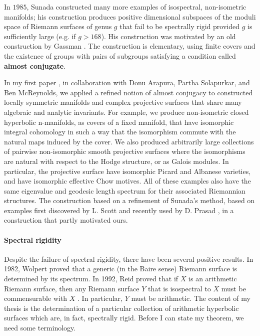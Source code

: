 \documentclass[12pt]{article}
\begin{document}
In $1985$, Sunada \cite{sunada1985}  constructed many more examples of isospectral, non-isometric manifolds; his construction produces positive dimensional subspaces of the moduli space of Riemann surfaces of genus $g$ that fail to be spectrally rigid provided $g$ is sufficiently large (e.g. if $g > 168$). His construction was motivated by an old construction by Gassman \cite{gassmann1926}. The
construction is elementary, using finite covers and the existence of groups with pairs of subgroups satisfying a condition called {\bf almost conjugate}. 

In my first paper \cite{arapura2019} , in collaboration with Donu Arapura, Partha Solapurkar, and Ben McReynolds, we applied a refined notion of almost conjugacy to  constructed locally symmetric manifolds and complex projective surfaces that share many algebraic and analytic invariants. For example, we produce non-isometric closed hyperbolic n-manifolds, as covers of a fixed manifold, that have isomorphic integral cohomology in such a way that the isomorphism commute with the natural maps induced by the cover. We also produced arbitrarily large collections of pairwise non-isomorphic smooth projective surfaces where the isomorphisms are natural with respect to the Hodge structure, or as Galois modules. In particular, the projective surface have isomorphic Picard and Albanese varieties, and have isomorphic effective Chow motives. All of these examples also have the same eigenvalue and geodesic length spectrum for their associated Riemannian structures. The construction based on a refinement of Sunada's method, based on examples first discovered by L. Scott \cite{scott1993integral}   and recently used by D. Prasad \cite{prasad2017}, in a construction that partly motivated ours.


\paragraph{Spectral rigidity} \label{par:specrigidity}
Despite the failure of spectral rigidity, there have been several positive
results. In 1982, Wolpert  \cite{wolpert1978}  proved that a generic (in the
Baire sense) Riemann surface is determined by its spectrum. In 1992,
Reid proved that if $X$ is an arithmetic Riemann surface, then any Riemann
surface $Y$ that is isospectral to $X$ must be commensurable with $X$ \cite{reid1992a}. In
particular, $Y$ must be arithmetic. The content of my thesis is the
determination of a particular collection of arithmetic  hyperbolic surfaces
which are, in fact, spectrally rigid. Before I can state my theorem, we need
some terminology.
\end{document}
